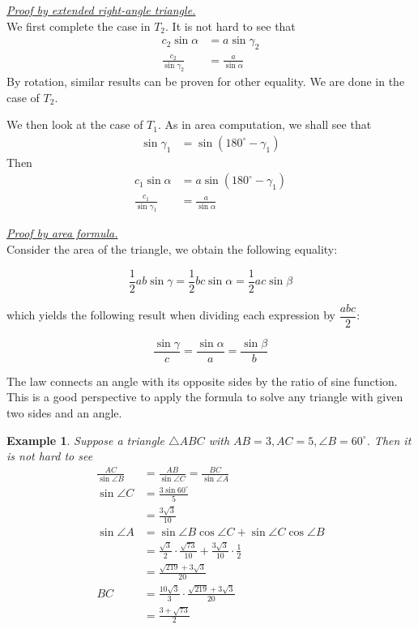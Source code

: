 \documentclass[12pt]{article}
\newtheorem*{example}{Example}
\renewenvironment{proof}[1][Proof]{\begin{snugshade*} \underline{\textit{{#1}.}}\\}{\hfill \qedsymbol \end{snugshade*}}
\begin{document}
    \begin{proof}[Proof by extended right-angle triangle]
        We first complete the case in $T_2$. It is not hard to see that \begin{align*}
            c_2\sin{\alpha}&=a\sin{\gamma_2}\\
            \frac{c_2}{\sin{\gamma_2}}&=\frac{a}{\sin{\alpha}}
        \end{align*}
        By rotation, similar results can be proven for other equality. We are done in the case of $T_2$.

        We then look at the case of $T_1$. As in area computation, we shall see that \begin{align*}
            \sin{\gamma_1}&=\sin(180^\circ - \gamma_1)
        \end{align*}
        Then \begin{align*}
            c_1\sin{\alpha}&=a\sin(180^\circ - \gamma_1)\\
            \frac{c_1}{\sin{\gamma_1}}&=\frac{a}{\sin{\alpha}}
        \end{align*}
    \end{proof}

    \begin{proof}[Proof by area formula]
        Consider the area of the triangle, we obtain the following equality:

        $$\frac{1}{2}ab\sin{\gamma}=\frac{1}{2}bc\sin{\alpha}=\frac{1}{2}ac\sin{\beta}$$

        which yields the following result when dividing each expression by $\dfrac{abc}{2}$:

        $$\frac{\sin{\gamma}}{c}=\frac{\sin{\alpha}}{a}=\frac{\sin{\beta}}{b}$$
    \end{proof}

    The law connects an angle with its opposite sides by the ratio of sine function. This is a good perspective to apply the formula to solve any triangle with given two sides and an angle.

    \begin{example}
        Suppose a triangle $\triangle ABC$ with $AB=3, AC=5, \angle B = 60^\circ$. Then it is not hard to see \begin{align*}
            \frac{AC}{\sin{\angle B}}&=\frac{AB}{\sin{\angle C}}=\frac{BC}{\sin{\angle A}}\\
            \sin{\angle C}&=\frac{3\sin{60^\circ}}{5}\\
            &=\frac{3\sqrt{3}}{10}\\
            \sin{\angle A}&=\sin{\angle B}\cos{\angle C}+\sin{\angle C}\cos{\angle B}\\
            &=\frac{\sqrt{3}}{2}\cdot \frac{\sqrt{73}}{10}+\frac{3\sqrt{3}}{10}\cdot \frac{1}{2}\\
            &=\frac{\sqrt{219}+3\sqrt{3}}{20}\\
            BC&=\frac{10\sqrt{3}}{3}\cdot\frac{\sqrt{219}+3\sqrt{3}}{20}\\
            &=\frac{3+\sqrt{73}}{2}
        \end{align*}
    \end{example}
\end{document}
